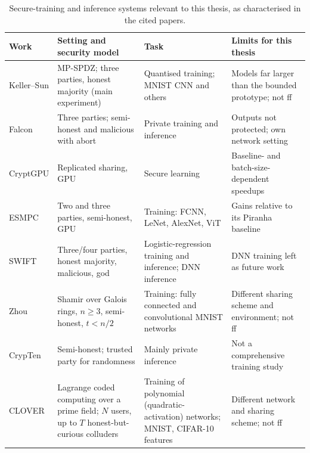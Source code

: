 \begin{table}[ht]
\centering
\footnotesize
\begin{tabular}{@{}>{\raggedright\arraybackslash}p{2.2cm}>{\raggedright\arraybackslash}p{3.8cm}>{\raggedright\arraybackslash}p{3.6cm}>{\raggedright\arraybackslash}p{4.0cm}@{}}
\toprule
Work & Setting and security model & Task & Limits for this thesis \\
\midrule
Keller--Sun \cite{keller2022sqt} & MP-SPDZ; three parties, honest majority (main experiment) & Quantised training; MNIST CNN and others & Models far larger than the bounded prototype; not \ac{ff} \\
Falcon \cite{wagh2021falcon} & Three parties; semi-honest and malicious with abort & Private training and inference & Outputs not protected; own network setting \\
CryptGPU \cite{tan2021cryptgpu} & Replicated sharing, GPU & Secure learning & Baseline- and batch-size-dependent speedups \\
ESMPC \cite{yang2025esmpc} & Two and three parties, semi-honest, GPU & Training: FCNN, LeNet, AlexNet, ViT & Gains relative to its Piranha baseline \\
SWIFT \cite{koti2021swift} & Three/four parties, honest majority, malicious, \acs{god} & Logistic-regression training and inference; DNN inference & DNN training left as future work \\
Zhou \cite{zhou2026rmfe} & Shamir over Galois rings, $n\ge3$, semi-honest, $t<n/2$ & Training: fully connected and convolutional MNIST networks & Different sharing scheme and environment; not \ac{ff} \\
CrypTen \cite{knott2021crypten} & Semi-honest; trusted party for randomness & Mainly private inference & Not a comprehensive training study \\
CLOVER \cite{lu2024clover} & Lagrange coded computing over a prime field; $N$ users, up to $T$ honest-but-curious colluders & Training of polynomial (quadratic-activation) networks; MNIST, CIFAR-10 features & Different network and sharing scheme; not \ac{ff} \\
\bottomrule
\end{tabular}
\caption{Secure-training and inference systems relevant to this thesis, as characterised in the cited papers.}
\label{tab:lr-mpc}
\end{table}

